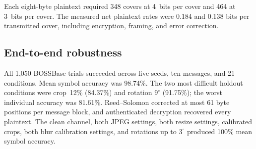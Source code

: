 ﻿\documentclass[10pt,journal]{IEEEtran}
\begin{document}
Each eight-byte plaintext required 348 covers at 4~bits per cover and
464 at 3~bits per cover. The measured net plaintext rates were 0.184
and 0.138 bits per transmitted cover, including encryption, framing,
and error correction.

\begin{table}[t]
\centering
\caption{Selected BOSSBase operating points on 8{,}000-image indices.}
\label{tab:config_boss}
\footnotesize
{}
\end{table}

\begin{table}[t]
\centering
\caption{Selected Caltech-101 operating points on 7{,}000-image RGB
  indices. All five partitions selected $K{=}16$.}
\label{tab:config_cal}
\footnotesize
{}
\end{table}

\subsection{End-to-end robustness}

All 1{,}050 BOSSBase trials succeeded across five seeds, ten messages,
and 21 conditions. Mean symbol accuracy was 98.74\%. The two most
difficult holdout conditions were crop~12\% (84.37\%) and rotation
$9^\circ$ (91.75\%); the worst individual accuracy was 81.61\%.
Reed--Solomon corrected at most 61 byte positions per message block,
and authenticated decryption recovered every plaintext. The clean
channel, both JPEG settings, both resize settings, calibrated crops,
both blur calibration settings, and rotations up to $3^\circ$ produced
100\% mean symbol accuracy.
\end{document}
